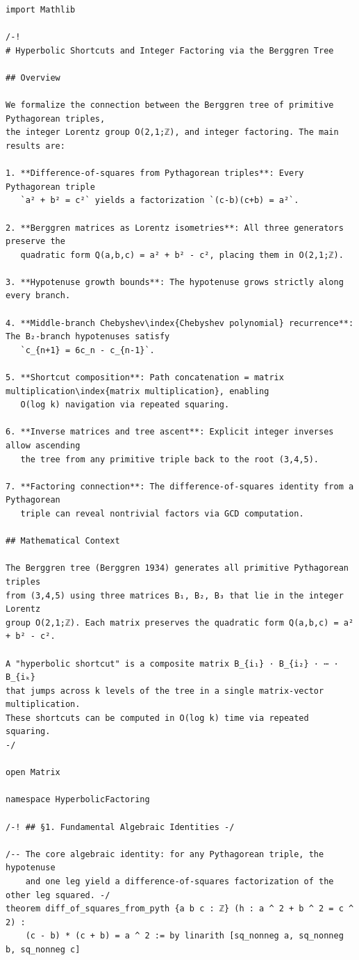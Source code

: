 \documentclass[11pt,openany]{book}
\theoremstyle{definition}
\theoremstyle{plain}
\theoremstyle{remark}
\begin{document}
\begin{lstlisting}[style=lean]
import Mathlib

/-!
# Hyperbolic Shortcuts and Integer Factoring via the Berggren Tree

## Overview

We formalize the connection between the Berggren tree of primitive Pythagorean triples,
the integer Lorentz group O(2,1;ℤ), and integer factoring. The main results are:

1. **Difference-of-squares from Pythagorean triples**: Every Pythagorean triple
   `a² + b² = c²` yields a factorization `(c-b)(c+b) = a²`.

2. **Berggren matrices as Lorentz isometries**: All three generators preserve the
   quadratic form Q(a,b,c) = a² + b² - c², placing them in O(2,1;ℤ).

3. **Hypotenuse growth bounds**: The hypotenuse grows strictly along every branch.

4. **Middle-branch Chebyshev\index{Chebyshev polynomial} recurrence**: The B₂-branch hypotenuses satisfy
   `c_{n+1} = 6c_n - c_{n-1}`.

5. **Shortcut composition**: Path concatenation = matrix multiplication\index{matrix multiplication}, enabling
   O(log k) navigation via repeated squaring.

6. **Inverse matrices and tree ascent**: Explicit integer inverses allow ascending
   the tree from any primitive triple back to the root (3,4,5).

7. **Factoring connection**: The difference-of-squares identity from a Pythagorean
   triple can reveal nontrivial factors via GCD computation.

## Mathematical Context

The Berggren tree (Berggren 1934) generates all primitive Pythagorean triples
from (3,4,5) using three matrices B₁, B₂, B₃ that lie in the integer Lorentz
group O(2,1;ℤ). Each matrix preserves the quadratic form Q(a,b,c) = a² + b² - c².

A "hyperbolic shortcut" is a composite matrix B_{i₁} · B_{i₂} · ⋯ · B_{iₖ}
that jumps across k levels of the tree in a single matrix-vector multiplication.
These shortcuts can be computed in O(log k) time via repeated squaring.
-/

open Matrix

namespace HyperbolicFactoring

/-! ## §1. Fundamental Algebraic Identities -/

/-- The core algebraic identity: for any Pythagorean triple, the hypotenuse
    and one leg yield a difference-of-squares factorization of the other leg squared. -/
theorem diff_of_squares_from_pyth {a b c : ℤ} (h : a ^ 2 + b ^ 2 = c ^ 2) :
    (c - b) * (c + b) = a ^ 2 := by linarith [sq_nonneg a, sq_nonneg b, sq_nonneg c]


\end{lstlisting}
\end{document}
